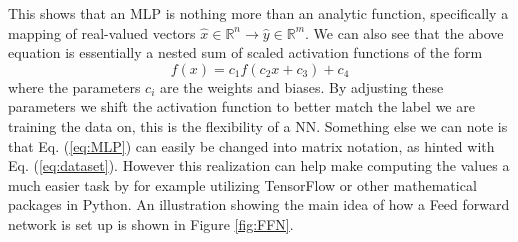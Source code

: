\documentclass[14pt, a4paper]{book}
\begin{document}
This shows that an MLP is nothing more than an analytic function, specifically a mapping of real-valued vectors $\hat{x}\in\mathbb{R}^n\rightarrow\hat{y}\in\mathbb{R}^m$. We can also see that the above equation is essentially 
a nested sum of scaled activation functions of the form
$$
  f(x)=c_1f(c_2x+c_3)+c_4  
$$
where the parameters $c_i$ are the weights and biases. By adjusting these parameters we shift the activation function to better match the label we are training the data on, this is the flexibility of a NN. 
Something else we can note is that Eq. (\ref{eq:MLP}) can easily be changed into matrix notation, as hinted with Eq. (\ref{eq:dataset}). However this realization can help make computing the values a much easier 
task by for example utilizing TensorFlow or other mathematical packages in Python. An illustration showing the main idea of how a Feed forward network is set up is shown in Figure \ref{fig:FFN}.
\end{document}
